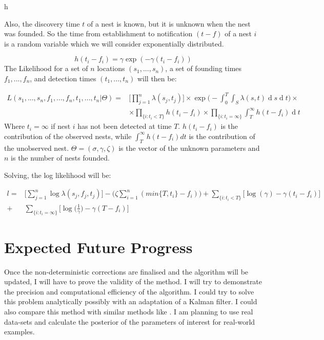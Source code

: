 h\documentclass[11pt,a4paper]{article}
\renewcommand{\d}[1]{\ensuremath{\operatorname{d}\!{#1}}}
\begin{document}
Also, the discovery time $t$ of a nest is known, but it is unknown when the nest was founded. So the time from establishment to notification $(t - f)$ of a nest $i$ is a random variable which we will consider exponentially distributed.

\[
h(t_{i} - f_{i}) = \gamma \exp (- \gamma(t_{i} - f_{i}))
\]
The Likelihood for a set of $n$ locations $(s_{1}, ... , s_{n})$, a set of founding times $f_{1}, ... , f_{n}$, and detection times $(t_{1},  ... , t_{n})$ will then be:

\[
\begin{aligned}
L(s_{1}, ..., s_{n}, f_{1}, ..., f_{n}, t_{1}, ..., t_{n} | \Theta) = & \Bigg[ \prod_{j=1}^{n} \lambda(s_{j}, t_{j}) \Bigg] \times \exp \Bigg(- \int_{0}^{T} \int_{S} \lambda(s, t) \d s \d t \Bigg) \times \\ 
& \times \prod_{\{ i : t_{i} < T \} } h (t_{i} - f_{i}) \times \prod_{ \{ i : t_{i} = \infty \} } \int_{T}^{\infty} h(t - f_{i}) \d t
\end{aligned}
\]
Where $t_{i} = \infty$ if nest $i$ has not been detected at time $T$. $h(t_{i} - f_{i})$ is the contribution of the observed nests, while $\int_{T}^{\infty} h(t - f_{i}) dt$ is the contribution of the unobserved nest. $\Theta= ( \sigma, \gamma, \zeta)$ is the vector of the unknown parameters and $n$ is the number of nests founded.

Solving, the log likelihood will be:

\[
\begin{aligned}
l = & \Bigg[ \sum_{j=1}^{n} \log \lambda(s_{j},f_{j}, t_{j}) \Bigg] - \bigg(\zeta \sum_{i=1}^{n} (min\{ T, t_i \} - f_i) \bigg)  + \sum_{\{ i : t_{i} < T \} }  \bigg[\log (\gamma) -\gamma(t_{i} - f_{i}) \bigg] \\
+ & \sum_{ \{ i : t_{i} = \infty \} } \bigg[\log \bigg(\frac{1}{\gamma}\bigg) -\gamma(T - f_{i}) \bigg]
\end{aligned}
\]

\section{Expected Future Progress}

Once the non-deterministic corrections are finalised and the algorithm will be updated, I will have to prove the validity of the method. I will try to demonstrate the precision and computational efficiency of the algorithm. I could try to solve this problem analytically possibly with an adaptation of a Kalman filter. I could also compare this method with similar methods like \cite{Del Moral}.
I am planning to use real data-sets and calculate the posterior of the parameters of interest for real-world examples.
\end{document}
